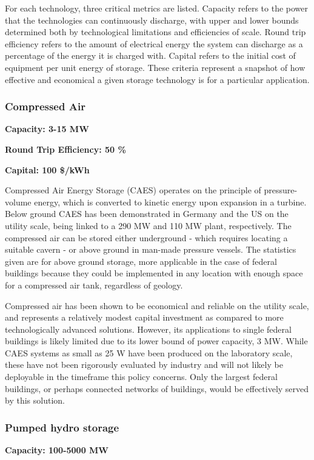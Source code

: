 For each technology, three critical metrics are listed. Capacity refers to the
power that the technologies can continuously discharge, with upper and lower
bounds determined both by technological limitations and efficiencies of scale.
Round trip efficiency refers to the amount of electrical energy the system can
discharge as a percentage of the energy it is charged with. Capital refers to
the initial cost of equipment per unit energy of storage. These criteria
represent a snapshot of how effective and economical a given storage technology
is for a particular application.

\subsubsection{Compressed Air}
\textbf{Capacity: 3-15 MW}

\noindent\textbf{Round Trip Efficiency: 50 \%}

\noindent\textbf{Capital: 100 \$/kWh}

Compressed Air Energy Storage (CAES) operates on the principle of
pressure-volume energy, which is converted to kinetic energy upon expansion in
a turbine. Below ground CAES has been demonstrated in Germany and the US on the
utility scale, being linked to a 290 MW and 110 MW plant, respectively. The
compressed air can be stored either underground - which requires locating a
suitable cavern - or above ground in man-made pressure vessels. The statistics
given are for above ground storage, more applicable in the case of federal
buildings because they could be implemented in any location with enough space
for a compressed air tank, regardless of geology.

Compressed air has been shown to be economical and reliable on the utility
scale, and represents a relatively modest capital investment as compared to
more technologically advanced solutions. However, its applications to single
federal buildings is likely limited due to its lower bound of power capacity, 3
MW. While CAES systems as small as 25 W have been produced on the laboratory
scale, these have not been rigorously evaluated by industry and will not likely
be deployable in the timeframe this policy concerns. Only the largest federal
buildings, or perhaps connected networks of buildings, would be effectively
served by this solution.

\subsubsection{Pumped hydro storage}
\textbf{Capacity: 100-5000 MW}

